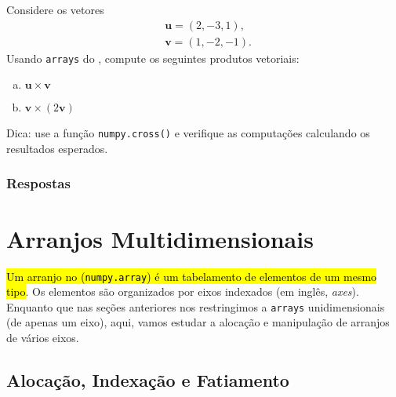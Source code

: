 \begin{exer}
  Considere os vetores
  \begin{align}
    &\pmb{u} = (2, -3, 1),\\
    &\pmb{v} = (1, -2, -1).
  \end{align}
  Usando \lstinline+arrays+ do {\numpy}, compute os seguintes produtos vetoriais:
  \begin{enumerate}[a)]
  \item $\pmb{u}\times\pmb{v}$
  \item $\pmb{v}\times (2\pmb{v})$
  \end{enumerate}
\end{exer}
\begin{resp}
  Dica: use a função \lstinline+numpy.cross()+ e verifique as computações calculando os resultados esperados.
\end{resp}

\ifisbook
\subsubsection{Respostas}
\shipoutAnswer
\fi


\section{Arranjos Multidimensionais}\label{cap_arr_sec_multi}

\hl{Um arranjo no {\numpy} ({\lstinline+numpy.array+}) é um tabelamento de elementos de um mesmo tipo}. Os elementos são organizados por eixos indexados (em inglês, \textit{axes}). Enquanto que nas seções anteriores nos restringimos a \lstinline+arrays+ unidimensionais (de apenas um eixo), aqui, vamos estudar a alocação e manipulação de arranjos de vários eixos.

\subsection{Alocação, Indexação e Fatiamento}

